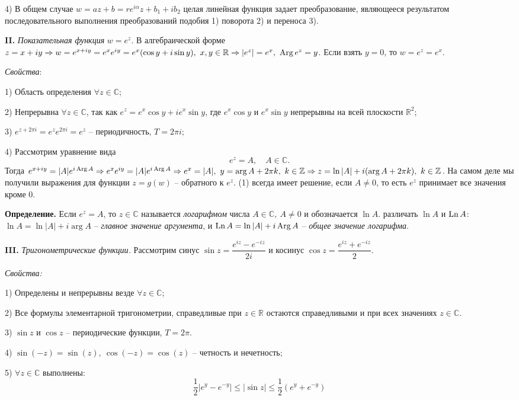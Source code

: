 \documentclass[9pt]{article}
\begin{document}
\par4) В общем случае \(w=az+b=re^{i\alpha}z+b_1+ib_2\) целая линейная функция задает преобразование, являющееся результатом последовательного выполнения преобразований подобия 1) поворота 2) и переноса 3).

\par\textbf{II.} \textit{Показательная функция} \(w=e^z\). В алгебраической форме \(z=x+iy\Rightarrow w=e^{x+iy}=e^xe^{iy}=e^x(\cos y+i\sin y),\ x,y\in \mathbb R\Rightarrow |e^z|=e^x,\ \operatorname{Arg} e^z=y\). Если взять \(y=0\), то \(w=e^z=e^x\).
\par\textit{Свойства}:
\par1) Область определения \(\forall z\in\mathbb C\);
\par2) Непрерывна \(\forall z\in\mathbb C\), так как \(e^z=e^x\cos y+ie^x\sin y\), где \(e^x\cos y\) и \(e^x\sin y\) непрерывны на всей плоскости \(\mathbb R^2\);
\par3) \(e^{z+2\pi i}=e^ze^{2\pi i}=e^z\) -- периодичность, \(T=2\pi i\);
\par4) Рассмотрим уравнение вида
\begin{equation}
e^z=A,\quad A\in\mathbb C.
\end{equation}
Тогда \(e^{x+iy}=|A|e^{i\operatorname{Arg} A}\Rightarrow e^xe^{iy}=|A|e^{i\operatorname{Arg} A}\Rightarrow e^x=|A|,\ y = \arg A + 2\pi k,\ k\in \mathbb Z \Rightarrow z=\ln|A|+i(\arg A + 2\pi k),\ k\in\mathbb Z\). На самом деле мы получили выражения для функции \(z=g(w)\) -- обратного к \(e^z\).
 (1) всегда имеет решение, если \(A\neq 0\), то есть \(e^z\) принимает все значения кроме 0.
\par\textbf{Определение.} Если \(e^z=A\), то \(z\in\mathbb C\) называется \textit{логарифмом} числа \(A\in\mathbb C,\ A\neq 0\) и обозначается \(\ln A\).
 различать \(\ln A\) и \(\operatorname{Ln} A\): \(\ln A = \ln|A|+i\arg A\) -- \textit{главное значение аргумента}, и \(\operatorname{Ln} A=\ln|A|+i\operatorname{Arg} A\) -- \textit{общее значение логарифма}.
\par\textbf{III.} \textit{Тригонометрические функции.} Рассмотрим синус \(\sin z = \dfrac{e^{iz}-e^{-iz}}{2i}\) и косинус \(\cos z = \dfrac{e^{iz}+e^{-iz}}{2}\).
\par\textit{Свойства:}
\par1) Определены и непрерывны везде \(\forall z\in\mathbb C\);
\par2) Все формулы элементарной тригонометрии, справедливые при \(z\in\mathbb R\) остаются справедливыми и при всех значениях \(z\in\mathbb C\).
\par3) \(\sin z\) и \(\cos z\) -- периодические функции, \(T=2\pi\).
\par4) \(\sin (-z)=\sin(z),\ \cos(-z)=\cos(z)\) -- четность и нечетность;
\par5) \(\forall z\in \mathbb C\) выполнены:
\begin{equation}
    \frac{1}{2}|e^y-e^{-y}|\le|\sin z|\le\frac{1}{2}(e^y+e^{-y})
\end{equation}
\end{document}
